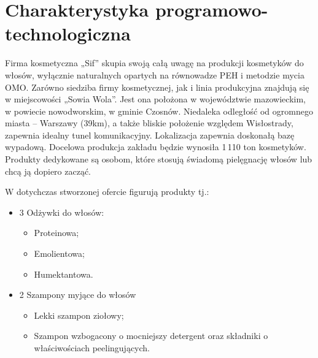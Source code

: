 \section{Charakterystyka programowo-technologiczna}

Firma kosmetyczna „Sif” skupia swoją całą uwagę na produkcji kosmetyków do włosów, wyłącznie naturalnych opartych na równowadze PEH i metodzie mycia OMO. Zarówno siedziba firmy kosmetycznej, jak i linia produkcyjna znajdują się w miejscowości „Sowia Wola”. Jest ona położona w województwie mazowieckim, w powiecie nowodworskim, w gminie Czosnów. Niedaleka odległość od ogromnego miasta – Warszawy (39km), a także bliskie położenie względem Wisłostrady, zapewnia idealny tunel komunikacyjny. Lokalizacja zapewnia doskonałą bazę wypadową. Docelowa produkcja zakładu będzie wynosiła 1\,110 ton kosmetyków.
Produkty dedykowane są osobom, które stosują świadomą pielęgnację włosów lub chcą ją dopiero zacząć. \vspace{\baselineskip}

W dotychczas stworzonej ofercie figurują produkty tj.:

\begin{itemize}
	\item 3 Odżywki do włosów:
	\begin{itemize}
	\item Proteinowa;
	\item Emolientowa;
	\item Humektantowa.
	\end{itemize}
	\item 2 Szampony myjące do włosów
	\begin{itemize}
	\item Lekki szampon ziołowy;
	\item Szampon wzbogacony o mocniejszy detergent oraz składniki o właściwościach peelingujących.
	\end{itemize}
\end{itemize}\vspace{\baselineskip}

